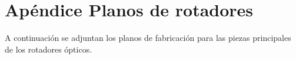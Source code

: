 
\chapter{Apéndice Planos de rotadores} %

\label{AppendixA} %


\graphicspath{{Figures/planos_piezas_rotador/}{../Figures/planos_piezas_rotador/}} 

A continuación se adjuntan los planos de fabricación para las piezas
principales de los rotadores ópticos. 

